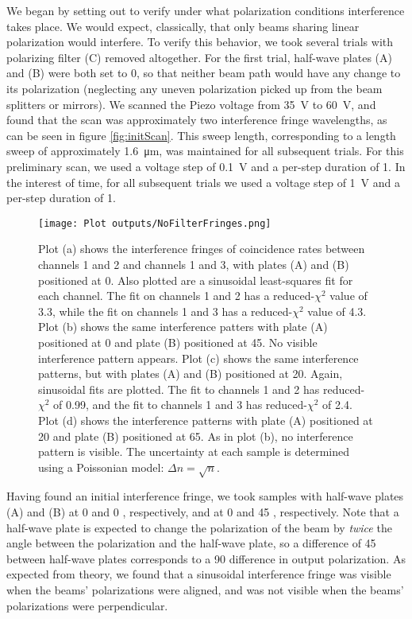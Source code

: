\documentclass[letter]{article}
\begin{document}
We began by setting out to verify under what polarization conditions interference takes place. We would expect, classically, that only beams sharing linear polarization would interfere. To verify this behavior, we took several trials with polarizing filter (C) removed altogether. For the first trial, half-wave plates (A) and (B) were both set to \qty{0}{\deg}, so that neither beam path would have any change to its polarization (neglecting any uneven polarization picked up from the beam splitters or mirrors). We scanned the Piezo voltage from \qty{35}{\volt} to \qty{60}{\volt}, and found that the scan was approximately two interference fringe wavelengths, as can be seen in figure \ref{fig:initScan}. This sweep length, corresponding to a length sweep of approximately \qty{1.6}{\um}, was maintained for all subsequent trials. For this preliminary scan, we used a voltage step of \qty{0.1}{\volt} and a per-step duration of \qty{1}{\sec}. In the interest of time, for all subsequent trials we used a voltage step of \qty{1}{\volt} and a per-step duration of \qty{1}{\sec}.

\begin{figure}[h] \centering
    \texttt{[image: Plot outputs/NoFilterFringes.png]}
    \caption{Plot (a) shows the interference fringes of coincidence rates between channels 1 and 2 and channels 1 and 3, with plates (A) and (B) positioned at \qty{0}{\deg}. Also plotted are a sinusoidal least-squares fit for each channel. The fit on channels 1 and 2 has a reduced-$\chi^2$ value of 3.3, while the fit on channels 1 and 3 has a reduced-$\chi^2$ value of 4.3. Plot (b) shows the same interference patters with plate (A) positioned at \qty{0}{\deg} and plate (B) positioned at \qty{45}{\deg}. No visible interference pattern appears. Plot (c) shows the same interference patterns, but with plates (A) and (B) positioned at \qty{20}{\deg}. Again, sinusoidal fits are plotted. The fit to channels 1 and 2 has reduced-$\chi^2$ of 0.99, and the fit to channels 1 and 3 has reduced-$\chi^2$ of 2.4. Plot (d) shows the interference patterns with plate (A) positioned at \qty{20}{\deg} and plate (B) positioned at \qty{65}{\deg}. As in plot (b), no interference pattern is visible. The uncertainty at each sample is determined using a Poissonian model: $\Delta n = \sqrt{n}$.}
    \label{fig:scanImages}
\end{figure}

Having found an initial interference fringe, we took samples with half-wave plates (A) and (B) at 0 and 0 \unit{\deg}, respectively, and at 0 and 45 \unit{\deg}, respectively. Note that a half-wave plate is expected to change the polarization of the beam by \textit{twice} the angle between the polarization and the half-wave plate, so a difference of \qty{45}{\deg} between half-wave plates corresponds to a \qty{90}{\deg} difference in output polarization. As expected from theory, we found that a sinusoidal interference fringe was visible when the beams' polarizations were aligned, and was not visible when the beams' polarizations were perpendicular.
\end{document}
